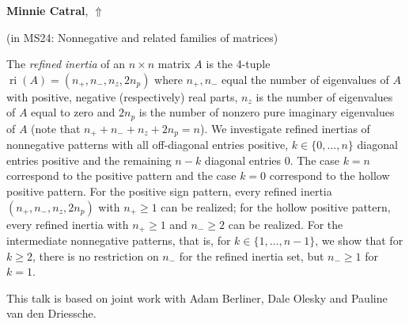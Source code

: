 \documentclass[ILAS2025-program.tex]{subfiles}
\begin{document}
\hypertarget{down0198}{}\begin{ilasabstract}
    
\textbf{Minnie Catral},  \hfill \hyperlink{up0198}{$\Uparrow$}
    
    
(in {\color{mstitle}MS24: Nonnegative and related families of matrices})
        
\mtskip
    \newcommand{\ri}{\operatorname{ri}}
The  {\em refined inertia} of  an $n\times n$ matrix $A$  is the 4-tuple $\ri(A)=(n_+,n_-,n_z,2n_p)$ where $n_+,n_-$ equal the number of eigenvalues of $A$ with positive, negative (respectively) real parts, $n_z$ is the number of eigenvalues of $A$  equal to zero and $2n_p$ is the number of nonzero pure imaginary eigenvalues of $A$ (note that $n_+ + n_-+ n_z+2n_p = n$).  
We investigate refined inertias of nonnegative patterns with  all off-diagonal entries positive,  $k \in\{0, \dots, n\}$ diagonal entries positive and the remaining $n-k$ diagonal entries $0$. The case $k=n$ correspond to the positive pattern and the case $k=0$ correspond to the hollow positive pattern. For the positive sign pattern, every refined inertia  $(n_+, n_-, n_z, 2n_p)$ with $n_+ \geq 1$  can be realized; for the hollow positive  pattern, every refined inertia with $n_+ \geq 1$ and $n_- \geq 2$ can be realized. For the intermediate nonnegative patterns, that is, for  $k \in\{1, \dots, n-1\}$, we show that for $k \geq 2$,  there is no restriction on $n_-$ for the refined inertia set, but  $n_- \geq 1$ for $k=1$. 

This talk is based on joint work with Adam Berliner, Dale Olesky and Pauline van den Driessche.
\end{ilasabstract}
    
\end{document}
